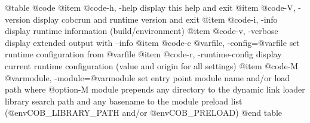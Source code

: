 @table @code
@item @code{-h, -help}
display this help and exit
@item @code{-V, -version}
display cobcrun and runtime version and exit
@item @code{-i, -info}
display runtime information (build/environment)
@item @code{-v, -verbose}
display extended output with --info
@item @code{-c @var{file}, -config=@var{file}}
set runtime configuration from @var{file}
@item @code{-r, -runtime-config}
display current runtime configuration
(value and origin for all settings)
@item @code{-M @var{module}, -module=@var{module}}
set entry point module name and/or load path
where @option{-M} module prepends any directory to the
dynamic link loader library search path
and any basename to the module preload list
(@env{COB_LIBRARY_PATH} and/or @env{COB_PRELOAD})
@end table
